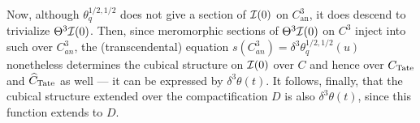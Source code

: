Now, although $\theta^{1/2,1/2}_q$ does not give a section of $\mathcal{I}(0)$ on $C^3_{\mathrm{an}}$, it does descend to trivialize $\Theta^3 \mathcal{I}(0)$.  Then, since meromorphic sections of $\Theta^3 \mathcal{I}(0)$ on $C^3$ inject into such over $C_{an}^3$, the (transcendental) equation $s(C_{an}^3) = \delta^3 \theta^{1/2,1/2}_q(u)$ nonetheless determines the cubical structure on $\mathcal{I}(0)$ over $C$ and hence over $C_{\mathrm{Tate}}$ and $\widehat C_{\mathrm{Tate}}$ as well --- it can be expressed by $\delta^3 \theta(t)$.  It follows, finally, that the cubical structure extended over the compactification $D$ is also $\delta^3 \theta(t)$, since this function extends to $D$.





